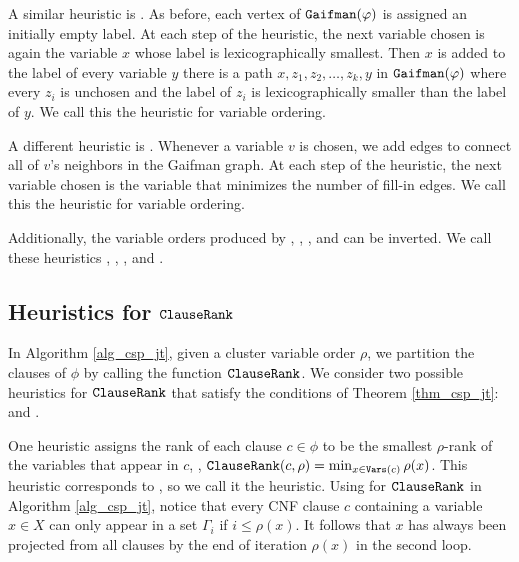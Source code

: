 A similar heuristic is  \cite{koster2001treewidth}.
As before, each vertex of $\texttt{\upshape Gaifman}(\varphi)$ is assigned an initially empty label.
At each step of the heuristic, the next variable chosen is again the variable $x$ whose label is lexicographically smallest.
Then $x$ is added to the label of every variable $y$ \st{} there is a path $x, z_1, z_2, \ldots, z_k, y$ in $\texttt{\upshape Gaifman}(\varphi)$ where every $z_i$ is unchosen and the label of $z_i$ is lexicographically smaller than the label of $y$.
We call this the \Lexm{} heuristic for variable ordering.

A different heuristic is  \cite{dechter03}.
Whenever a variable $v$ is chosen, we add  edges to connect all of $v$'s neighbors in the Gaifman graph.
At each step of the heuristic, the next variable chosen is the variable that minimizes the number of fill-in edges.
We call this the \Minfill{} heuristic for variable ordering.

Additionally, the variable orders produced by \Mcs{}, \Lexp{}, \Lexm, and \Minfill{} can be inverted.
We call these heuristics \Invmcs, \Invlexp, \Invlexm, and \Invminfill.


\subsection{Heuristics for \texorpdfstring{$\texttt{\upshape ClauseRank}$}{ClauseRank}}

In Algorithm \ref{alg_csp_jt}, given a cluster variable order $\rho$, we partition the clauses of $\phi$ by calling the function $\texttt{\upshape ClauseRank}$.
We consider two possible heuristics for $\texttt{\upshape ClauseRank}$ that satisfy the conditions of Theorem \ref{thm_csp_jt}: \Be{} and \Bm{}.

One heuristic assigns the rank of each clause $c \in \phi$ to be the smallest $\rho$-rank of the variables that appear in $c$, \ie, $\texttt{\upshape ClauseRank}(c, \rho) = \min_{x \in \texttt{\upshape Vars}(c)} \rho(x)$.
This heuristic corresponds to  \cite{dechter99}, so we call it the \Be{} heuristic.
Using \Be{} for $\texttt{\upshape ClauseRank}$ in Algorithm \ref{alg_csp_jt}, notice that every CNF clause $c$ containing a variable $x \in X$ can only appear in a set $\Gamma_i$ if $i \le \rho(x)$.
It follows that $x$ has always been projected from all clauses by the end of iteration $\rho(x)$ in the second loop.

